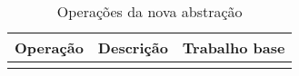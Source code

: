 \begin{table}[]
\centering
\begin{tabular}{|l|l|l|}
  \hline
  \textbf{Operação} & \textbf{Descrição} & \textbf{Trabalho base} \\ \hline
  \multicolumn{1}{|c|}{} & \multicolumn{1}{c|}{} &               \\ \hline
\end{tabular}
\caption{Operações da nova abstração}
\label{tab:ops_atomize}
\end{table}
